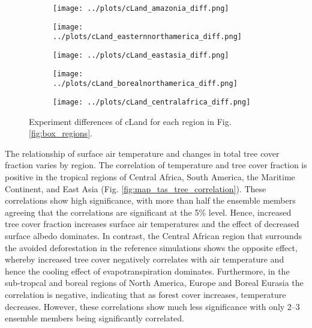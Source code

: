 \documentclass[]{article}
\begin{document}
\begin{figure}[H]
    \centering
    \begin{subfigure}[b]{0.4\linewidth}
        \texttt{[image: ../plots/cLand\_amazonia\_diff.png]}
    \end{subfigure}

    \begin{subfigure}[b]{0.4\linewidth}
        \texttt{[image: ../plots/cLand\_easternnorthamerica\_diff.png]}
    \end{subfigure}
    \begin{subfigure}[b]{0.4\linewidth}
        \texttt{[image: ../plots/cLand\_eastasia\_diff.png]}
    \end{subfigure}
    \begin{subfigure}[b]{0.4\linewidth}
        \texttt{[image: ../plots/cLand\_borealnorthamerica\_diff.png]}
    \end{subfigure}
    \begin{subfigure}[b]{0.4\linewidth}
        \texttt{[image: ../plots/cLand\_centralafrica\_diff.png]}
    \end{subfigure}
    \caption{Experiment differences of cLand for each region in Fig. \ref{fig:box_regions}.}
    \label{fig:accesss_regional_cland}
\end{figure}

The relationship of surface air temperature and changes in total tree cover fraction varies by region.
The correlation of temperature and tree cover fraction is positive in the tropical regions of Central Africa, South America, the Maritime Continent, and East Asia (Fig. \ref{fig:map_tas_tree_correlation}).
These correlations show high significance, with more than half the ensemble members agreeing that the correlations are significant at the 5\% level.
Hence, increased tree cover fraction increases surface air temperatures and the effect of decreased surface albedo dominates.
In contrast, the Central African region that surrounds the avoided deforestation in the reference simulations shows the opposite effect, whereby increased tree cover negatively correlates with air temperature and hence the cooling effect of evapotranspiration dominates.
Furthermore, in the sub-tropcal and boreal regions of North America, Europe and Boreal Eurasia the correlation is negative, indicating that as forest cover increases, temperature decreases.
However, these correlations show much less significance with only 2--3 ensemble members being significantly correlated.
\end{document}
